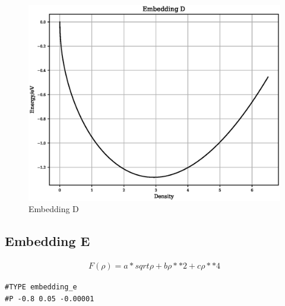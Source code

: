\documentclass[12pt,twoside]{manual}
\begin{document}
\begin{appendices}
\FloatBarrier
\begin{figure}[h]
  \begin{center}
    \includegraphics[scale=0.5]{img/plots/embedding_d.eps}
    \caption{Embedding D}
    \label{graph:graph1}
  \end{center}
\end{figure}
\FloatBarrier








\subsection{Embedding E}

\begin{equation}
\begin{split}
F(\rho) = a * sqrt{\rho} + b \rho**2 + c \rho**4
\end{split}
\label{eq:embeddingE}
\end{equation}

\begin{lstlisting}[style=pseudocode,caption={Embedding E}]
#TYPE embedding_e
#P -0.8 0.05 -0.00001
\end{lstlisting}


\end{appendices}
\end{document}
